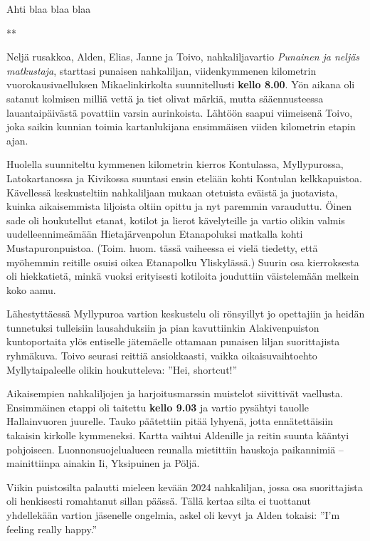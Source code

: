 \begin{multicols}{2}
\noindent Ahti blaa blaa blaa

{\smallskip\noindent\centering ***\par\smallskip}

Neljä rusakkoa, Alden, Elias, Janne ja Toivo, nahkaliljavartio 
\textit{Punainen ja neljäs matkustaja}, starttasi punaisen nahkaliljan, 
viidenkymmenen kilometrin vuorokausivaelluksen Mikaelinkirkolta suunnitellusti 
\textbf{kello 8.00}. Yön aikana oli satanut kolmisen milliä vettä ja tiet 
olivat märkiä, mutta sääennusteessa lauantaipäivästä povattiin varsin 
aurinkoista. Lähtöön saapui viimeisenä Toivo, joka saikin kunnian toimia 
kartanlukijana ensimmäisen viiden kilometrin etapin ajan.

Huolella suunniteltu kymmenen kilometrin kierros Kontulassa, Myllypurossa, 
Latokartanossa ja Kivikossa suuntasi ensin etelään kohti Kontulan 
kelkkapuistoa. Kävellessä keskusteltiin nahkaliljaan mukaan otetuista 
eväistä ja juotavista, kuinka aikaisemmista liljoista oltiin opittu ja nyt 
paremmin varauduttu. Öinen sade oli houkutellut etanat, kotilot ja lierot 
kävelyteille ja vartio olikin valmis uudelleennimeämään Hietajärvenpolun 
Etanapoluksi matkalla kohti Mustapuronpuistoa. (Toim. huom. tässä vaiheessa 
ei vielä tiedetty, että myöhemmin reitille osuisi oikea Etanapolku 
Yliskylässä.) Suurin osa kierroksesta oli hiekkatietä, minkä vuoksi 
erityisesti kotiloita jouduttiin väistelemään melkein koko aamu. 

Lähestyttäessä Myllypuroa vartion keskustelu oli rönsyillyt jo opettajiin 
ja heidän tunnetuksi tulleisiin lausahduksiin ja pian kavuttiinkin 
Alakivenpuiston kuntoportaita ylös entiselle jätemäelle ottamaan punaisen 
liljan suorittajista ryhmäkuva. Toivo seurasi reittiä ansiokkaasti, vaikka 
oikaisuvaihtoehto Myllytaipaleelle olikin houkutteleva: ''Hei, shortcut!''

Aikaisempien nahkaliljojen ja harjoitusmarssin muistelot siivittivät 
vaellusta. Ensimmäinen etappi oli taitettu \textbf{kello 9.03} ja vartio 
pysähtyi tauolle Hallainvuoren juurelle. Tauko päätettiin pitää lyhyenä, 
jotta ennätettäisiin takaisin kirkolle kymmeneksi. Kartta vaihtui Aldenille 
ja reitin suunta kääntyi pohjoiseen. Luonnonsuojelualueen reunalla mietittiin 
hauskoja paikannimiä -- mainittiinpa ainakin Ii, Yksipuinen ja Pöljä. 

Viikin puistosilta palautti mieleen kevään 2024 nahkaliljan, jossa osa 
suorittajista oli henkisesti romahtanut sillan päässä. Tällä kertaa silta 
ei tuottanut yhdellekään vartion jäsenelle ongelmia, askel oli kevyt ja 
Alden tokaisi: ''I'm feeling really happy.''


\end{multicols}
